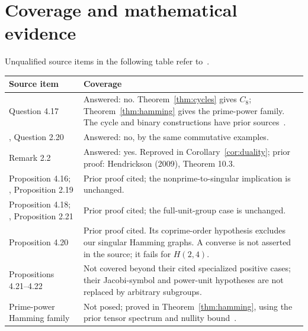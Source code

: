 \documentclass[10pt]{article}
\begin{document}
\section{Coverage and mathematical evidence}
\noindent Unqualified source items in the following table refer to~\cite{NT}.
\begin{center}\small
\begin{tabular}{@{}p{.25\linewidth}p{.69\linewidth}@{}}
\toprule
Source item & Coverage \\
\midrule
Question 4.17 & Answered: no. Theorem~\ref{thm:cycles} gives $C_8$;
Theorem~\ref{thm:hamming} gives the prime-power family. The cycle and
binary constructions have prior sources~\cite{MMNT,Chen}.\\
\cite{NT26}, Question 2.20 & Answered: no, by the same commutative examples.\\
Remark 2.2 & Answered: yes. Reproved in Corollary~\ref{cor:duality};
prior proof: Hendrickson (2009), Theorem 10.3.\\
Proposition 4.16; \cite{NT26}, Proposition 2.19 & Prior proof cited;
the nonprime-to-singular implication is unchanged.\\
Proposition 4.18; \cite{NT26}, Proposition 2.21 & Prior proof cited;
the full-unit-group case is unchanged.\\
Proposition 4.20 & Prior proof cited. Its coprime-order hypothesis
excludes our singular Hamming graphs. A converse is not asserted in
the source; it fails for $H(2,4)$.\\
Propositions 4.21--4.22 & Not covered beyond their cited specialized
positive cases; their Jacobi-symbol and power-unit hypotheses are
not replaced by arbitrary subgroups.\\
Prime-power Hamming family & Not posed; proved in
Theorem~\ref{thm:hamming}, using the prior tensor spectrum and
nullity bound~\cite{Sander,CC}.\\
\bottomrule
\end{tabular}
\end{center}
\end{document}

